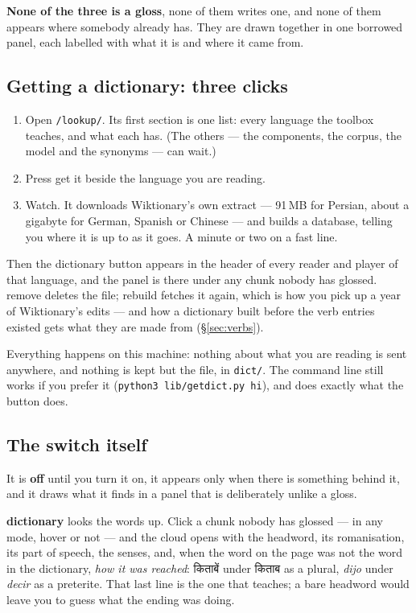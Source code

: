 \documentclass[11pt,oneside]{report}
\newcommand{\sw}[1]{\foreignlanguage{spanish}{\emph{#1}}}
\newcommand{\hw}[1]{\mbox{\foreignlanguage{hindi}{#1}}}
\newcommand{\file}[1]{\texttt{#1}}
\newcommand{\menu}[1]{\textsf{#1}}
\begin{document}
\textbf{None of the three is a gloss}, none of them writes one, and none of
them appears where somebody already has. They are drawn together in one
borrowed panel, each labelled with what it is and where it came from.

\subsection*{Getting a dictionary: three clicks}

\begin{enumerate}
\item Open \texttt{/lookup/}. Its first section is one list: every language
  the toolbox teaches, and what each has. (The others --- the components, the
  corpus, the model and the synonyms --- can wait.)
\item Press \menu{get it} beside the language you are reading.
\item Watch. It downloads Wiktionary's own extract --- 91\,MB for Persian,
  about a gigabyte for German, Spanish or Chinese --- and builds a database,
  telling you where it is up to as it goes. A minute or two on a fast line.
\end{enumerate}

\noindent Then the \menu{dictionary} button appears in the header of every
reader and player of that language, and the panel is there under any chunk
nobody has glossed. \menu{remove} deletes the file; \menu{rebuild} fetches it
again, which is how you pick up a year of Wiktionary's edits --- and how a
dictionary built before the verb entries existed gets what they are made
from (\S\ref{sec:verbs}).

Everything happens on this machine: nothing about what you are reading is
sent anywhere, and nothing is kept but the file, in \file{dict/}. The command
line still works if you prefer it (\texttt{python3 lib/getdict.py hi}), and
does exactly what the button does.

\subsection*{The switch itself}

It is \textbf{off} until you turn it on, it appears only when there is
something behind it, and it draws what it finds in a panel that is
deliberately unlike a gloss.

\textbf{\menu{dictionary}} looks the words up. Click a chunk nobody has
glossed --- in any mode, hover or not --- and the cloud opens with the
headword, its romanisation, its part of speech, the senses, and, when the
word on the page was not the word in the dictionary, \emph{how it was
reached}: \hw{किताबें} under \hw{किताब} as a plural, \sw{dijo} under
\sw{decir} as a preterite. That last line is the one that teaches; a bare
headword would leave you to guess what the ending was doing.
\end{document}
